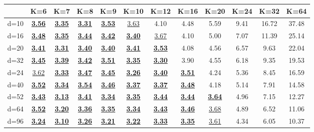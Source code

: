 \begin{table}[H]
\centering
\label{tab:table3}
\begin{tabular}{|c|c|c|c|c|c|c|c|c|c|c|c|}
\hline
& K=6 & K=7 & K=8 & K=9 & K=10 & K=12 & K=16 & K=20 & K=24 & K=32 & K=64 \\
\hline
d=10 & \underline{\textbf{3.56}} & \underline{\textbf{3.35}} & \underline{\textbf{3.31}} & \underline{\textbf{3.53}} & \underline{3.63} & 4.10 & 4.48 & 5.59 & 9.41 & 16.72 & 37.48 \\
d=16 & \underline{\textbf{3.48}} & \underline{\textbf{3.35}} & \underline{\textbf{3.44}} & \underline{\textbf{3.42}} & \underline{\textbf{3.40}} & \underline{3.67} & 4.10 & 5.00 & 7.07 & 11.39 & 25.14 \\
d=20 & \underline{\textbf{3.41}} & \underline{\textbf{3.31}} & \underline{\textbf{3.40}} & \underline{\textbf{3.40}} & \underline{\textbf{3.41}} & \underline{\textbf{3.53}} & 4.08 & 4.56 & 6.57 & 9.63 & 22.04 \\
d=32 & \underline{\textbf{3.45}} & \underline{\textbf{3.39}} & \underline{\textbf{3.42}} & \underline{\textbf{3.51}} & \underline{\textbf{3.35}} & \underline{\textbf{3.30}} & 3.90 & 4.55 & 6.18 & 9.35 & 19.53 \\
d=24 & \underline{3.62} & \underline{\textbf{3.33}} & \underline{\textbf{3.47}} & \underline{\textbf{3.45}} & \underline{\textbf{3.26}} & \underline{\textbf{3.40}} & \underline{\textbf{3.51}} & 4.24 & 5.36 & 8.45 & 16.59 \\
d=40 & \underline{\textbf{3.52}} & \underline{\textbf{3.34}} & \underline{\textbf{3.54}} & \underline{\textbf{3.46}} & \underline{\textbf{3.37}} & \underline{\textbf{3.37}} & \underline{\textbf{3.48}} & 4.18 & 5.14 & 7.91 & 14.58 \\
d=52 & \underline{\textbf{3.43}} & \underline{\textbf{3.13}} & \underline{\textbf{3.41}} & \underline{\textbf{3.34}} & \underline{\textbf{3.35}} & \underline{\textbf{3.44}} & \underline{\textbf{3.44}} & \underline{\textbf{3.64}} & 4.96 & 7.15 & 12.27 \\
d=64 & \underline{\textbf{3.52}} & \underline{\textbf{3.20}} & \underline{\textbf{3.36}} & \underline{\textbf{3.35}} & \underline{\textbf{3.34}} & \underline{\textbf{3.43}} & \underline{\textbf{3.46}} & \underline{3.68} & 4.89 & 6.52 & 11.06 \\
d=96 & \underline{\textbf{3.24}} & \underline{\textbf{3.10}} & \underline{\textbf{3.26}} & \underline{\textbf{3.21}} & \underline{\textbf{3.22}} & \underline{\textbf{3.33}} & \underline{\textbf{3.35}} & \underline{3.61} & 4.34 & 6.05 & 10.37 \\

\end{tabular}
\end{table}
